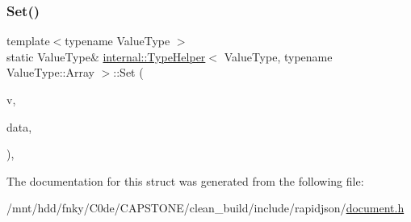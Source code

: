 \subsubsection{\texorpdfstring{Set()}{Set()}\hspace{0.1cm}{\footnotesize\ttfamily [2/2]}}
{\footnotesize\ttfamily template$<$typename Value\+Type $>$ \\
static Value\+Type\& \hyperlink{structinternal_1_1TypeHelper}{internal\+::\+Type\+Helper}$<$ Value\+Type, typename Value\+Type\+::\+Array $>$\+::Set (\begin{DoxyParamCaption}\item[{Value\+Type \&}]{v,  }\item[{\hyperlink{structinternal_1_1TypeHelper_3_01ValueType_00_01typename_01ValueType_1_1Array_01_4_a8f384dc96b6104e85b956ec5f7386434}{Array\+Type}}]{data,  }\item[{typename Value\+Type\+::\+Allocator\+Type \&}]{ }\end{DoxyParamCaption})\hspace{0.3cm}{\ttfamily [inline]}, {\ttfamily [static]}}



The documentation for this struct was generated from the following file\+:\begin{DoxyCompactItemize}
\item 
/mnt/hdd/fnky/\+C0de/\+C\+A\+P\+S\+T\+O\+N\+E/clean\+\_\+build/include/rapidjson/\hyperlink{document_8h}{document.\+h}\end{DoxyCompactItemize}
